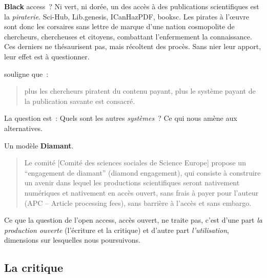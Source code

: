 
\textbf{Black} access~? Ni vert, ni dorée, un des accès à des publications scientifiques est la \textit{piraterie}.
Sci-Hub, Lib.genesis, ICanHazPDF, booksc.
Les pirates à l’œuvre sont donc les corsaires sans lettre de marque d'une nation cosmopolite de chercheurs, chercheuses et citoyens, combattant l'enfermement la connaissance.
Ces derniers ne thésaurisent pas, mais récoltent des procès.
Sans nier leur apport, leur effet est à questionner.

\citeauthor{ernesto_priego_signal_2016} souligne que~:
\blockcquote[traduction]{ernesto_priego_signal_2016}{
plus les chercheurs piratent du contenu payant, plus le système payant de la publication savante est consacré.
}
La question est~: Quels sont les autres \emph{systèmes}~?
Ce qui nous amène aux alternatives.

Un modèle \textbf{Diamant}.
\blockcquote{dacos_engagement_2015}{
Le comité [Comité des sciences sociales de Science Europe] propose un “engagement de diamant” (diamond engagement), qui consiste à construire un avenir dans lequel les productions scientifiques seront nativement numériques et nativement en accès ouvert, sans frais à payer pour l’auteur (APC – Article processing fees), sans barrière à l’accès et sans embargo.
}

Ce que la question de l'open access, accès ouvert, ne traite pas, c'est d'une part \emph{la production ouverte} (l'écriture et la critique) et d'autre part \emph{l'utilisation}, dimensions sur lesquelles nous poursuivons.
\subsection{La critique}

